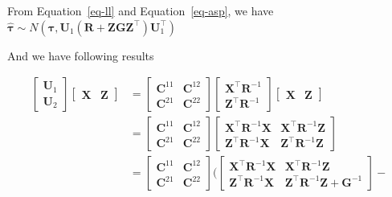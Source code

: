 \documentclass[
  a4paper,
  oneside,
  openany,
  12pt,
  onecolumn]{book}
\theoremstyle{plain}
\theoremstyle{definition}
\theoremstyle{remark}
\begin{document}
From Equation~\ref{eq-ll} and Equation~\ref{eq-asp}, we have
\(\hat{\boldsymbol{\tau}}\sim N(\boldsymbol{\tau},\boldsymbol{U}_1(\boldsymbol{R}+\boldsymbol{ZGZ}^\top)\boldsymbol{U}_1^\top)\)

And we have following results

\[\begin{aligned}
\begin{bmatrix}
\boldsymbol{U}_1 \\
\boldsymbol{U}_2
\end{bmatrix}
\begin{bmatrix}
\boldsymbol{X} & \boldsymbol{Z}
\end{bmatrix}
&=
\begin{bmatrix}
\boldsymbol{C}^{11} & \boldsymbol{C}^{12} \\
\boldsymbol{C}^{21} & \boldsymbol{C}^{22}
\end{bmatrix}
\begin{bmatrix}
\boldsymbol{X}^\top\boldsymbol{R}^{-1}\\
\boldsymbol{Z}^\top\boldsymbol{R}^{-1}
\end{bmatrix}
\begin{bmatrix}
\boldsymbol{X} & \boldsymbol{Z}
\end{bmatrix}\\
&=
\begin{bmatrix}
\boldsymbol{C}^{11} & \boldsymbol{C}^{12} \\
\boldsymbol{C}^{21} & \boldsymbol{C}^{22}
\end{bmatrix}
\begin{bmatrix}
\boldsymbol{X}^\top\boldsymbol{R}^{-1}\boldsymbol{X} & \boldsymbol{X}^\top\boldsymbol{R}^{-1}\boldsymbol{Z}\\
\boldsymbol{Z}^\top\boldsymbol{R}^{-1}\boldsymbol{X} & \boldsymbol{Z}^\top\boldsymbol{R}^{-1}\boldsymbol{Z}
\end{bmatrix}\\
&=
\begin{bmatrix}
\boldsymbol{C}^{11} & \boldsymbol{C}^{12} \\
\boldsymbol{C}^{21} & \boldsymbol{C}^{22}
\end{bmatrix}
(
\begin{bmatrix}
\boldsymbol{X}^\top\boldsymbol{R}^{-1}\boldsymbol{X} & \boldsymbol{X}^\top\boldsymbol{R}^{-1}\boldsymbol{Z}\\
\boldsymbol{Z}^\top\boldsymbol{R}^{-1}\boldsymbol{X} & \boldsymbol{Z}^\top\boldsymbol{R}^{-1}\boldsymbol{Z}+\boldsymbol{G}^{-1}
\end{bmatrix}-

\end{aligned}\]
\end{document}
